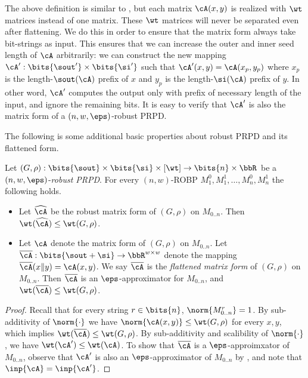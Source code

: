 \begin{remark}\label{rmk:mon}
The above definition is similar to , but each matrix $\cA(x,y)$ is realized with $\wt$ matrices instead of one matrix. These $\wt$ matrices will never be separated even after flattening. We do this in order to ensure that the matrix form always take bit-strings as input. This ensures that we can increase the outer and inner seed length of $\cA$ arbitrarily: we can construct the new mapping $\cA':\bits{\sout'}\times\bits{\si'}$ such that $\cA'(x,y)=\cA(x_p,y_p)$ where $x_p$ is the length-$\sout(\cA)$ prefix of $x$ and $y_p$ is the length-$\si(\cA)$ prefix of $y$. In other word, $\cA'$ computes the output only with prefix of necessary length of the input, and ignore the remaining bits. It is easy to verify that $\cA'$ is also the matrix form of a $(n,w,\eps)$-robust PRPD.
\end{remark}
\noindent
The following is some additional basic properties about robust PRPD and its flattened form.
\begin{claim}\label{claim:std-approx}
Let $(G,\rho):\bits{\sout}\times\bits{\si}\times{[\wt]}\to\bits{n}\times\bbR$ be a $(n,w,\eps)$-\emph{robust PRPD}. For every $(n,w)$-ROBP $M_1^0,M_1^1,\dots,M_n^0,M_n^1$ the following holds.
\begin{itemize}
\item 
Let $\widehat{\cA}$ be the robust matrix form of $(G,\rho)$ on $M_{0..n}$. Then $\wt(\widehat{\cA})\le \wt(G,\rho)$.
\item
Let $\cA$ denote the matrix form of $(G,\rho)$ on $M_{0..n}$. Let $\overline{\cA}:\bits{\sout+\si}\to\bbR^{w\times w}$ denote the mapping $\overline{\cA}(x\Vert y)=\cA(x,y)$. We say $\overline{\cA}$ is the \emph{flattened matrix form} of $(G,\rho)$ on $M_{0..n}$. Then $\overline{\cA}$ is an $\eps$-approximator for $M_{0..n}$, and $\wt(\overline{\cA})\le\wt(G,\rho)$.
\end{itemize}
\end{claim}
\begin{proof}
Recall that for every string $r\in\bits{n}$, $\norm{M_{0..n}^r}=1$. By sub-additivity of $\norm{\cdot}$ we have $\norm{\cA(x,y)}\le\wt(G,\rho)$ for every $x,y$, which implies $\wt(\overline{\cA})\le\wt(G,\rho)$. By sub-additivity and scalibility of $\norm{\cdot}$, we have $\wt(\cA')\le \wt(\cA)$. To show that $\overline{\cA}$ is a $\eps$-approimxator of $M_{0..n}$, observe that $\cA'$ is also an $\eps$-approximator of $M_{0..n}$ by , and note that $\inp{\cA}=\inp{\cA'}$.
\end{proof}
